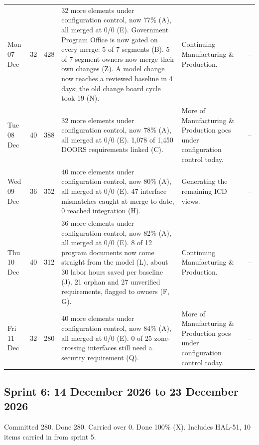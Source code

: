 \documentclass[12pt,letterpaper,oneside]{article}
\begin{document}
{\begin{longtable}{@{}>{\raggedright}p{} r r >{\raggedright}p{} >{\raggedright}p{} >{\raggedright\arraybackslash}p{}@{}}
Mon 07 Dec & 32 & 428 & 32 more elements under configuration control, now 77\% (A), all merged at 0/0 (E). Government Program Office is now gated on every merge: 5 of 7 segments (B). 5 of 7 segment owners now merge their own changes (Z). A model change now reaches a reviewed baseline in 4 days; the old change board cycle took 19 (N). & Continuing Manufacturing \& Production. & -- \\
Tue 08 Dec & 40 & 388 & 32 more elements under configuration control, now 78\% (A), all merged at 0/0 (E). 1,078 of 1,450 DOORS requirements linked (C). & More of Manufacturing \& Production goes under configuration control today. & -- \\
Wed 09 Dec & 36 & 352 & 40 more elements under configuration control, now 80\% (A), all merged at 0/0 (E). 47 interface mismatches caught at merge to date, 0 reached integration (H). & Generating the remaining ICD views. & -- \\
Thu 10 Dec & 40 & 312 & 36 more elements under configuration control, now 82\% (A), all merged at 0/0 (E). 8 of 12 program documents now come straight from the model (L), about 30 labor hours saved per baseline (J). 21 orphan and 27 unverified requirements, flagged to owners (F, G). & Continuing Manufacturing \& Production. & -- \\
Fri 11 Dec & 32 & 280 & 40 more elements under configuration control, now 84\% (A), all merged at 0/0 (E). 0 of 25 zone-crossing interfaces still need a security requirement (Q). & More of Manufacturing \& Production goes under configuration control today. & -- \\
\end{longtable}}
\subsection{Sprint 6: 14 December 2026 to 23 December 2026}
Committed 280. Done 280. Carried over 0. Done 100\% (X). Includes HAL-51, 10 items carried in from sprint 5.
\end{document}
